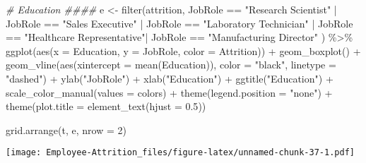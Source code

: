 \documentclass[
]{article}
\newenvironment{Shaded}{\begin{snugshade}}{\end{snugshade}}
\newcommand{\AttributeTok}[1]{\textcolor[rgb]{0.77,0.63,0.00}{#1}}
\newcommand{\CommentTok}[1]{\textcolor[rgb]{0.56,0.35,0.01}{\textit{#1}}}
\newcommand{\DecValTok}[1]{\textcolor[rgb]{0.00,0.00,0.81}{#1}}
\newcommand{\FloatTok}[1]{\textcolor[rgb]{0.00,0.00,0.81}{#1}}
\newcommand{\FunctionTok}[1]{\textcolor[rgb]{0.00,0.00,0.00}{#1}}
\newcommand{\NormalTok}[1]{#1}
\newcommand{\OtherTok}[1]{\textcolor[rgb]{0.56,0.35,0.01}{#1}}
\newcommand{\SpecialCharTok}[1]{\textcolor[rgb]{0.00,0.00,0.00}{#1}}
\newcommand{\StringTok}[1]{\textcolor[rgb]{0.31,0.60,0.02}{#1}}
\begin{document}
\begin{Shaded}
\begin{Highlighting}[]
\CommentTok{\# Education \#\#\#\#}
\NormalTok{e }\OtherTok{\textless{}{-}} \FunctionTok{filter}\NormalTok{(attrition, JobRole }\SpecialCharTok{==} \StringTok{"Research Scientist"} \SpecialCharTok{|}\NormalTok{ JobRole }\SpecialCharTok{==} \StringTok{"Sales Executive"}  \SpecialCharTok{|}\NormalTok{ JobRole }\SpecialCharTok{==} \StringTok{"Laboratory Technician"} \SpecialCharTok{|}\NormalTok{ JobRole }\SpecialCharTok{==} \StringTok{"Healthcare Representative"}\SpecialCharTok{|}\NormalTok{ JobRole }\SpecialCharTok{==} \StringTok{"Manufacturing Director"}\NormalTok{ ) }\SpecialCharTok{\%\textgreater{}\%}
  \FunctionTok{ggplot}\NormalTok{(}\FunctionTok{aes}\NormalTok{(}\AttributeTok{x =}\NormalTok{ Education, }\AttributeTok{y =}\NormalTok{ JobRole, }\AttributeTok{color =}\NormalTok{ Attrition)) }\SpecialCharTok{+}
  \FunctionTok{geom\_boxplot}\NormalTok{() }\SpecialCharTok{+}
  \FunctionTok{geom\_vline}\NormalTok{(}\FunctionTok{aes}\NormalTok{(}\AttributeTok{xintercept =} \FunctionTok{mean}\NormalTok{(Education)), }\AttributeTok{color =} \StringTok{"black"}\NormalTok{, }\AttributeTok{linetype =} \StringTok{"dashed"}\NormalTok{) }\SpecialCharTok{+}
  \FunctionTok{ylab}\NormalTok{(}\StringTok{"JobRole"}\NormalTok{) }\SpecialCharTok{+}
  \FunctionTok{xlab}\NormalTok{(}\StringTok{"Education"}\NormalTok{) }\SpecialCharTok{+}
  \FunctionTok{ggtitle}\NormalTok{(}\StringTok{"Education"}\NormalTok{) }\SpecialCharTok{+}
  \FunctionTok{scale\_color\_manual}\NormalTok{(}\AttributeTok{values =}\NormalTok{ colors) }\SpecialCharTok{+}
  \FunctionTok{theme}\NormalTok{(}\AttributeTok{legend.position =} \StringTok{"none"}\NormalTok{) }\SpecialCharTok{+}
  \FunctionTok{theme}\NormalTok{(}\AttributeTok{plot.title =} \FunctionTok{element\_text}\NormalTok{(}\AttributeTok{hjust =} \FloatTok{0.5}\NormalTok{)) }


\FunctionTok{grid.arrange}\NormalTok{(t, e, }\AttributeTok{nrow =} \DecValTok{2}\NormalTok{)}
\end{Highlighting}
\end{Shaded}

\texttt{[image: Employee-Attrition\_files/figure-latex/unnamed-chunk-37-1.pdf]}
\end{document}
